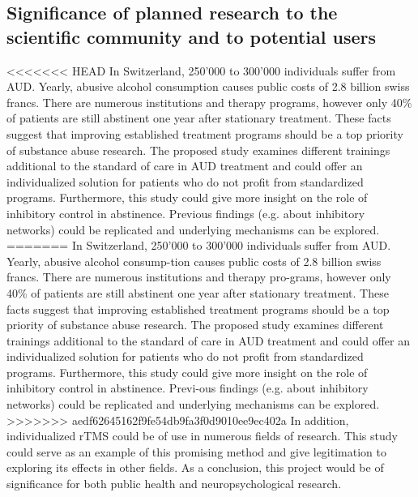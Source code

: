 \documentclass[12pt]{article}
\begin{document}
\subsection{Significance of planned research to the scientific community and to potential users}
<<<<<<< HEAD
In Switzerland, 250’000 to 300’000 individuals suffer from AUD. Yearly, abusive alcohol consumption causes public costs of 2.8 billion swiss francs. There are numerous institutions and therapy programs, however only 40\% of patients are still abstinent one year after stationary treatment. These facts suggest that improving established treatment programs should be a top priority of substance abuse research. The proposed study examines different trainings additional to the standard of care in AUD treatment and could offer an individualized solution for patients who do not profit from standardized programs. 
Furthermore, this study could give more insight on the role of inhibitory control in abstinence. Previous findings (e.g. about inhibitory networks) could be replicated and underlying mechanisms can be explored.
=======
In Switzerland, 250’000 to 300’000 individuals suffer from AUD. Yearly, abusive alcohol consump-tion causes public costs of 2.8 billion swiss francs. There are numerous institutions and therapy pro-grams, however only 40\% of patients are still abstinent one year after stationary treatment. These facts suggest that improving established treatment programs should be a top priority of substance abuse research. The proposed study examines different trainings additional to the standard of care in AUD treatment and could offer an individualized solution for patients who do not profit from standardized programs. 
Furthermore, this study could give more insight on the role of inhibitory control in abstinence. Previ-ous findings (e.g. about inhibitory networks) could be replicated and underlying mechanisms can be explored.
>>>>>>> aedf62645162f9fe54db9fa3f0d9010ee9ec402a
In addition, individualized rTMS could be of use in numerous fields of research. This study could serve as an example of this promising method and give legitimation to exploring its effects in other fields.
As a conclusion, this project would be of significance for both public health and neuropsychological research.



\printbibliography  
\end{document}

